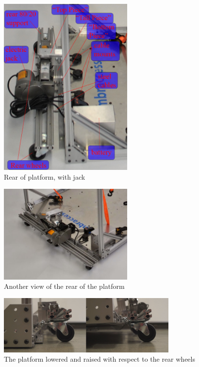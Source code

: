 \begin{figure}
\centering
 \includegraphics[width=0.6\textwidth]{images/rear_assembly}
\caption{Rear of platform, with jack}
\label{fig:rear_assembly}
\end{figure}

\begin{figure}
\centering
 \includegraphics[width=0.6\textwidth]{images/rear_alternate}
\caption{Another view of the rear of the platform}
\label{fig:rear_alt}
\end{figure}

\begin{figure}
\centering
 \includegraphics[width=0.8\textwidth]{images/rear_raise}
\caption{The platform lowered and raised with respect to the rear wheels}
\label{fig:rear_raise}
\end{figure}

